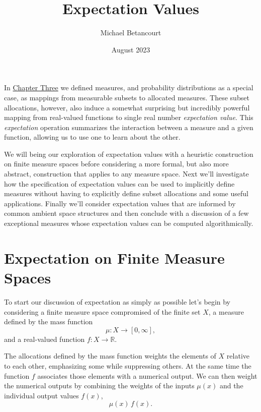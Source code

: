\documentclass[
  letterpaper,
  DIV=11,
  numbers=noendperiod]{scrartcl}
\title{Expectation Values}
\author{Michael Betancourt}
\date{August 2023}
\renewcommand*\contentsname{Table of contents}
\newcommand\contentsname{Table of contents}
\begin{document}
\maketitle
\ifdefined\Shaded\renewenvironment{Shaded}{\begin{tcolorbox}[sharp corners, frame hidden, breakable, boxrule=0pt, interior hidden, borderline west={3pt}{0pt}{shadecolor}, enhanced]}{\end{tcolorbox}}\fi

\renewcommand*\contentsname{Table of contents}
{
\hypersetup{linkcolor=}
\setcounter{tocdepth}{3}
\tableofcontents
}
In
\href{https://betanalpha.github.io/assets/chapters_html/probability_on_general_spaces.html}{Chapter
Three} we defined measures, and probability distributions as a special
case, as mappings from measurable subsets to allocated measures. These
subset allocations, however, also induce a somewhat surprising but
incredibly powerful mapping from real-valued functions to single real
number \emph{expectation value}. This \emph{expectation} operation
summarizes the interaction between a measure and a given function,
allowing us to use one to learn about the other.

We will being our exploration of expectation values with a heuristic
construction on finite measure spaces before considering a more formal,
but also more abstract, construction that applies to any measure space.
Next we'll investigate how the specification of expectation values can
be used to implicitly define measures without having to explicitly
define subset allocations and some useful applications. Finally we'll
consider expectation values that are informed by common ambient space
structures and then conclude with a discussion of a few exceptional
measures whose expectation values can be computed algorithmically.

\hypertarget{finite_expectation}{%
\section{Expectation on Finite Measure
Spaces}\label{finite_expectation}}

To start our discussion of expectation as simply as possible let's begin
by considering a finite measure space compromised of the finite set
\(X\), a measure defined by the mass function \[
\mu : X \rightarrow [0, \infty],
\] and a real-valued function \(f : X \rightarrow \mathbb{R}\).

The allocations defined by the mass function weights the elements of
\(X\) relative to each other, emphasizing some while suppressing others.
At the same time the function \(f\) associates those elements with a
numerical output. We can then weight the numerical outputs by combining
the weights of the inputs \(\mu(x)\) and the individual output values
\(f(x)\), \[
\mu(x) \, f(x).
\]
\end{document}
